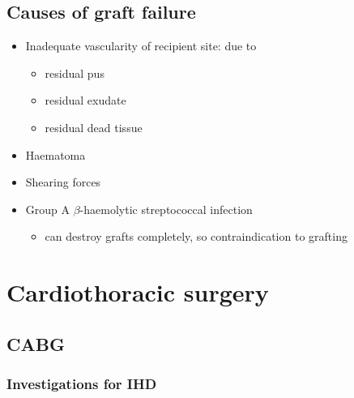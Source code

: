 \documentclass[
  12pt,
]{memoir}
\providecommand{\tightlist}{%
  \setlength{\itemsep}{0pt}\setlength{\parskip}{0pt}}
\begin{document}
\hypertarget{causes-of-graft-failure}{%
\section{Causes of graft failure}\label{causes-of-graft-failure}}

\begin{itemize}
\tightlist
\item
  Inadequate vascularity of recipient site: due to

  \begin{itemize}
  \tightlist
  \item
    residual pus
  \item
    residual exudate
  \item
    residual dead tissue
  \end{itemize}
\item
  Haematoma
\item
  Shearing forces
\item
  Group A \(\beta\)-haemolytic streptococcal infection

  \begin{itemize}
  \tightlist
  \item
    can destroy grafts completely, so contraindication to grafting
  \end{itemize}
\end{itemize}

\pagebreak

\hypertarget{cardiothoracic-surgery}{%
\chapter{Cardiothoracic surgery}\label{cardiothoracic-surgery}}

\hypertarget{cabg}{%
\section{CABG}\label{cabg}}

\hypertarget{investigations-for-ihd}{%
\subsection{Investigations for IHD}\label{investigations-for-ihd}}
\end{document}
